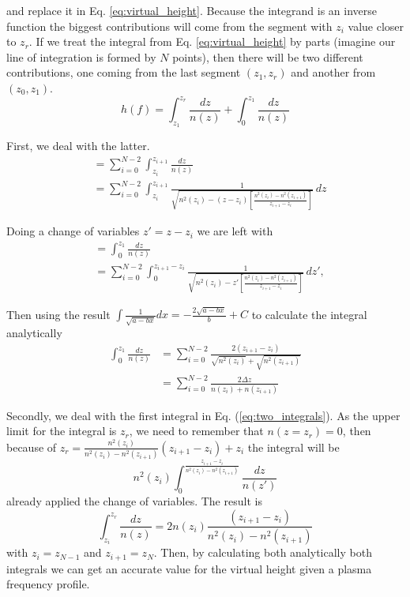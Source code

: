 \documentclass[aps,twocolumn,prb,showpacs,superscriptaddress]{revtex4-2}
\newcommand{\+}{\dagger}
\begin{document}
and replace it in Eq. \ref{eq:virtual_height}. Because the integrand is an inverse function the biggest contributions will come from the segment with \(z_i\) value closer to \(z_r\). If we treat the integral from Eq. \ref{eq:virtual_height} by parts (imagine our line of integration is formed by \(N\) points), then there will be two different contributions, one coming from the last segment \((z_1, z_r)\) and another from \((z_0, z_1)\).
\begin{equation}
h(f) = \int_{z_1}^{z_r} \frac{dz}{n(z)} + \int_0^{z_1} \frac{dz}{n(z)}
\label{eq:two_integrals}
\end{equation}

First, we deal with the latter.
\begin{equation}
    \begin{split}
        &= \sum_{i=0}^{N-2} \int_{z_i}^{z_{i+1}} \frac{dz}{n(z)}\\
        &= \sum_{i=0}^{N-2} \int_{z_i}^{z_{i+1}} \frac{1}{\sqrt{n^2(z_i) - (z - z_i) \left[\frac{n^2(z_i) - n^2(z_{i+1})}{z_{i+1} - z_i}\right]}} \, dz
    \end{split}
\end{equation}

Doing a change of variables \(z' = z - z_i\) we are left with
\begin{equation}
    \begin{split}
        &= \int_0^{z_1} \frac{dz}{n(z)}\\
        &= \sum_{i=0}^{N-2} \int_0^{z_{i+1} - z_i} \frac{1}{\sqrt{n^2(z_i) - z' \left[\frac{n^2(z_i) - n^2(z_{i+1})}{z_{i+1} - z_i}\right]}} \, dz',
    \end{split}
\end{equation}

Then using the result \(\int \frac{1}{\sqrt{a - b x}} dx = -\frac{2\sqrt{a - b x}}{b} + C\) to calculate the integral analytically
\begin{equation}
\begin{split}
    \int_0^{z_1} \frac{dz}{n(z)} &= \sum_{i=0}^{N-2} \frac{2 (z_{i+1} - z_i)}{\sqrt{n^2(z_i)} + \sqrt{n^2(z_{i+1})}}\\
    &= \sum_{i=0}^{N-2} \frac{2 \Delta z}{n(z_i) + n(z_{i+1})}
\end{split}
\end{equation}

Secondly, we deal with the first integral in Eq. (\ref{eq:two_integrals}). As the upper limit for the integral is $z_r$, we need to remember that $n(z = z_r) = 0$, then because of 
\(
z_r = \frac{n^2(z_i)}{n^2(z_i) - n^2(z_{i+1})} (z_{i+1} - z_i) + z_i
\)
the integral will be
\begin{equation}
n^2(z_i) \int_0^{\frac{z_{i+1} - z_i}{n^2(z_i) - n^2(z_{i+1})}} \frac{dz}{n(z')}
\end{equation}
already applied the change of variables. The result is
\begin{equation}
\int_{z_i}^{z_r} \frac{dz}{n(z)} = 2n(z_i) \frac{(z_{i+1} - z_i)}{n^2(z_i) - n^2(z_{i+1})}
\end{equation}
with $z_i = z_{N-1}$ and $z_{i+1} = z_N$. Then, by calculating both analytically both integrals we can get an accurate value for the virtual height given a plasma frequency profile.
\end{document}
